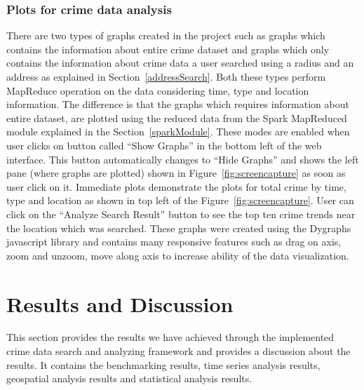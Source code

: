\subsubsection{Plots for crime data analysis}\label{plottingData}
There are two types of graphs created in the project such as graphs
which contains the information about entire crime dataset and graphs
which only contains the information about crime data a user searched
using a radius and an address as explained in
Section~\ref{addressSearch}. Both these types perform MapReduce
operation on the data considering time, type and location
information. The difference is that the graphs which requires
information about entire dataset, are plotted using the reduced data
from the Spark MapReduced module explained in the
Section~\ref{sparkModule}. These modes are enabled when user clicks on
button called ``Show Graphs'' in the bottom left of the web
interface. This button automatically changes to ``Hide Graphs'' and
shows the left pane (where graphs are plotted) shown in
Figure~\ref{fig:screencapture} as soon as user click on it. Immediate
plots demonstrate the plots for total crime by time, type and location
as shown in top left of the Figure~\ref{fig:screencapture}. User can
click on the ``Analyze Search Result'' button to see the top ten crime
trends near the location which was searched. These graphs were created
using the Dygraphs javascript library and contains many responsive
features such as drag on axis, zoom and unzoom, move along axis to
increase ability of the data visualization.

\section{Results and Discussion}
This section provides the results we have achieved through the
implemented crime data search and analyzing framework and provides a
discussion about the results. It contains the benchmarking results,
time series analysis results, geospatial analysis results and
statistical analysis results.

